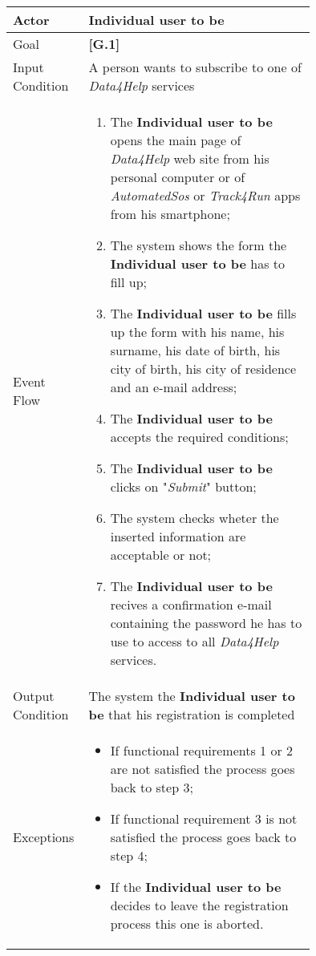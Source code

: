 \begin{center}
\begin{tabular}{ | l | p{0.75\linewidth} | }
  \hline
    Actor & \textbf{Individual user to be} \\ \hline
    Goal & \textbf{[G.1]} \\ \hline
    Input Condition & A person wants to subscribe to one of \textit{Data4Help} services \\ \hline
    Event Flow & \begin{minipage}[t]{0.7\textwidth}
      \begin{enumerate}
        \item The \textbf{Individual user to be} opens the main page of \textit{Data4Help} web site from his personal computer or of \textit{AutomatedSos} or \textit{Track4Run} apps from his smartphone;
        \item The system shows the form the \textbf{Individual user to be} has to fill up;
        \item The \textbf{Individual user to be} fills up the form with his name, his surname, his date of birth, his city of birth, his city of residence and an e-mail address;
        \item The \textbf{Individual user to be} accepts the required conditions;
        \item The \textbf{Individual user to be} clicks on "\textit{Submit}" button;
        \item The system checks wheter the inserted information are acceptable or not;
        \item The \textbf{Individual user to be} recives a confirmation e-mail containing the password he has to use to access to all \textit{Data4Help} services.
      \end{enumerate}
    \smallskip
  \end{minipage} \\ \hline
  Output Condition & The system the \textbf{Individual user to be} that his registration is completed \\ \hline
  Exceptions & \begin{minipage}[t]{0.7\textwidth}
    \begin{itemize}
      \smallskip
      \item If functional requirements 1 or 2 are not satisfied the process goes back to step 3;
      \item If functional requirement 3 is not satisfied the process goes back to step 4;
      \item If the \textbf{Individual user to be} decides to leave the registration process this one is aborted.
    \end{itemize}
    \smallskip
  \end{minipage}  \\ \hline
\end{tabular}
\end{center}
